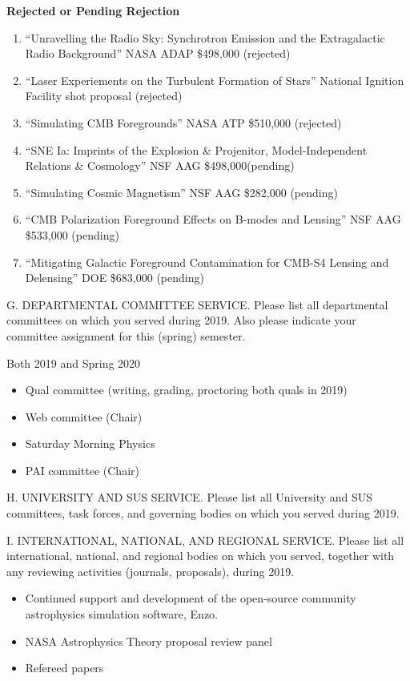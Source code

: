 \textbf{Rejected or Pending Rejection}
\begin{enumerate}
\item ``Unravelling the Radio Sky: Synchrotron Emission and the Extragalactic
    Radio Background'' NASA ADAP \$498,000 (rejected)
\item ``Laser Experiements on the Turbulent Formation of Stars'' National
    Ignition Facility shot proposal (rejected)
\item ``Simulating CMB Foregrounds'' NASA ATP \$510,000 (rejected)
\item ``SNE Ia: Imprints of the Explosion \& Projenitor, Model-Independent
    Relations \& Cosmology'' NSF AAG \$498,000(pending)
\item ``Simulating Cosmic Magnetism'' NSF AAG \$282,000 (pending) 
\item ``CMB Polarization Foreground Effects on B-modes and Lensing'' NSF AAG
    \$533,000 (pending)
\item ``Mitigating Galactic Foreground Contamination for CMB-S4 Lensing and
    Delensing'' DOE \$683,000 (pending)
\end{enumerate}

\noindent G. DEPARTMENTAL COMMITTEE SERVICE. Please list all
departmental committees on which you served during 2019.  Also
please indicate your committee assignment for this (spring)
semester.
\bigskip
%

Both 2019 and Spring 2020
\begin{itemize}
\item Qual committee (writing, grading, proctoring both quals in 2019)
\item Web committee (Chair)
\item Saturday Morning Physics
\item PAI committee (Chair)
\end{itemize}

\noindent H. UNIVERSITY AND SUS SERVICE. Please list all University
and SUS committees, task forces, and governing bodies on which you
served during 2019.
\bigskip
%

\noindent I. INTERNATIONAL, NATIONAL, AND REGIONAL  SERVICE. Please
list all international, national, and regional bodies on which you
served, together with any reviewing activities (journals,
proposals), during 2019.
\bigskip

\begin{itemize}
    \item Continued support and development of the open-source community
        astrophysics simulation software, Enzo.  
    \item NASA Astrophysics Theory proposal review panel
    \item Refereed papers
\end{itemize}

